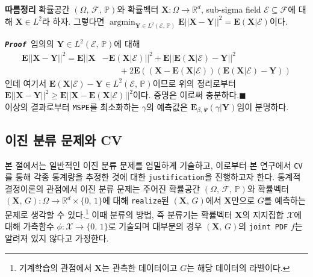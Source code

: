 \documentclass[11pt,onecolumn,twoside,a4size]{gsag3jnl}
\newcommand{\proof}{\texttt{\textit{\textbf{Proof }}}}
\DeclareMathOperator*{\argmin}{argmin}
\begin{document}
\noindent\textsf{\textbf{따름정리} 확률공간 $(\Omega,\,\mathcal{F},\,\mathbb{P})$와 확률벡터 $\mathbf{X}:\Omega\to\mathbb{R}^d$, sub-sigma field $\mathcal{E}\subseteq\mathcal{F}$에 대해 $\mathbf{X}\in L^2$라 하자. 그렇다면 $\argmin_{\mathbf{Y}\in L^2(\mathcal{E},\,\mathbb{P})}\mathbf{E}||\mathbf{X}-\mathbf{Y}||^2=\mathbf{E}(\mathbf{X}\vert\mathcal{E})$이다.}

\proof 임의의 $\mathbf{Y}\in L^2(\mathcal{E},\,\mathbb{P})$에 대해
\begin{align}
  \mathbf{E}||\mathbf{X}-\mathbf{Y}||^2=\mathbf{E}||\mathbf{X}&-\mathbf{E}(\mathbf{X}\vert\mathcal{E})||^2+\mathbf{E}||\mathbf{E}(\mathbf{X}\vert\mathcal{E})-\mathbf{Y}||^2\\
  &\qquad+2\mathbf{E}((\mathbf{X}-\mathbf{E}(\mathbf{X}\vert\mathcal{E}))(\mathbf{E}(\mathbf{X}\vert\mathcal{E})-\mathbf{Y}))\nonumber
\end{align}
인데 여기서 $\mathbf{E}(\mathbf{X}\vert\mathcal{E})-\mathbf{Y}\in L^2(\mathcal{E},\,\mathbb{P})$이므로 위의 정리로부터 $\mathbf{E}||\mathbf{X}-\mathbf{Y}||^2\geq\mathbf{E}||\mathbf{X}-\mathbf{E}(\mathbf{X}\vert\mathcal{E})||^2$이다. 증명은 이로써 충분하다.\hfill$\blacksquare$\\

이상의 결과로부터 \texttt{MSPE}를 최소화하는 $\gamma$의 예측값은 $\mathbf{E}_{\beta,\,\Psi}(\gamma\vert\mathbf{Y})$임이 분명하다.

\subsection{이진 분류 문제와 CV}

본 절에서는 일반적인 이진 분류 문제를 엄밀하게 기술하고, 이로부터 본 연구에서 \texttt{CV}를 통해 각종 통계량을 추정한 것에 대한 \texttt{justification}을 진행하고자 한다. 통계적 결정이론의 관점에서 이진 분류 문제는 주어진 확률공간 $(\Omega,\,\mathcal{F},\,\mathbb{P})$와 확률벡터 $(\mathbf{X},\,G):\Omega\to\mathbb{R}^d\times\{0,\,1\}$에 대해 \texttt{realize}된 $(\mathbf{X},\,G)$에서 $\mathbf{X}$만으로 $G$를 예측하는 문제로 생각할 수 있다.\footnote{기계학습의 관점에서 $\mathbf{X}$는 관측한 데이터이고 $G$는 해당 데이터의 라벨이다.} 이때 분류의 방법, 즉 분류기는 확률벡터 $\mathbf{X}$의 지지집합 $\mathcal{X}$에 대해 가측함수 $\phi:\mathcal{X}\to\{0,\,1\}$로 기술되며 대부분의 경우 $(\mathbf{X},\,G)$의 \texttt{joint PDF} $f$는 알려져 있지 않다고 가정한다.
\end{document}
